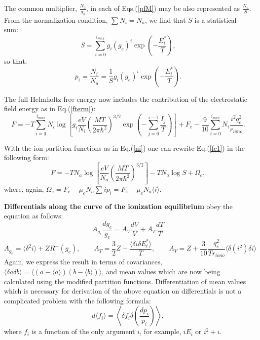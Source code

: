\documentclass[english,12pt]{revtex4}
\begin{document}
The common multiplier, $\frac{N_0}{g_0}$, in each of Eqs.(\ref{pfM}) may be also represented as $\frac{N_a}{S}$.
From the normalization condition, $\sum N_i = N_a$, we find that $S$ is a statistical sum:
\begin{equation}
S=\sum_{i=0}^{i_{max}} g_i (g_e)^i \exp\left(-\frac{E_i^*}T\right),
\end{equation}
so that:
\begin{equation}\label{ni}
p_i = \frac{N_i}{N_a} = \frac{1}S g_i (g_e)^i \exp \left( -\frac{E_i^*}T \right).
\end{equation}

The full Helmholtz free energy now includes the contribution of the electrostatic field energy as in Eq.(\ref{fterm}):
\begin{equation}\label{fe1}
F=-T
\sum_{i=0}^{i_{max}}{
N_i\log\left[g_i
  \frac{eV}{N_i}\left(\frac{MT}{2\pi \hbar^2}\right)^{3/2}\exp \left(-\sum_{j=0}^{i-1}\frac{I_j}T \right)\right]}+F_e
  -\frac{9}{10} \sum_{i=0}^{i_{max}} N_i \frac{i^2 q_e^2}{r_{iono}}.
\end{equation}  

With the ion partition functions as in Eq.(\ref{ni}) one can rewrite Eq.(\ref{fe1}) in the following form:
\begin{equation}\label{ffullm}
F = -TN_a\log\left[\frac{eV}{N_a}\left(\frac{MT}{2\pi \hbar^2}\right)^{3/2}\right]-TN_a\log S + \Omega_e, 
\end{equation}
where, again, $\Omega_e = F_e - \mu_e N_a \sum i p_i = F_e - \mu_e N_a \langle i \rangle $.

{\bf Differentials along the curve of the ionization equilibrium} obey the equation as follows:
\begin{equation}
A_{g_e} \frac{dg_e}{g_e} = A_V \frac{dV}{V} + A_T \frac{dT}{T}
\end{equation}
\begin{equation}
A_{g_e} = \langle \delta^2 i \rangle + ZR^-(g_e), \qquad
A_T     = \frac32 Z - \frac{\langle \delta i \delta E^*_i \rangle}{T}, \qquad
A_V     = Z + \frac{3}{10} \frac{q_e^2}{T r_{iono}} \langle \delta(i^2) \delta i \rangle
\end{equation}
Again, we express the result in terms of covariances,
$\langle \delta a \delta b \rangle = \langle (a - \langle a \rangle) (b - \langle b \rangle) \rangle$,
and mean values which are now being calculated
using the modified partition functions.
Differentiation of mean values which is necessary for derivation of the above equation on
differentials is not a complicated problem with the following formula:
\begin{equation}
d \langle f_i \rangle = \left\langle \delta f_i \delta\left( \frac{dp_i}{p_i} \right) \right\rangle,
\end{equation}
where $f_i$ is a function of the only argument $i$, for example, $iE_i$ or $i^2+i$.
\end{document}

